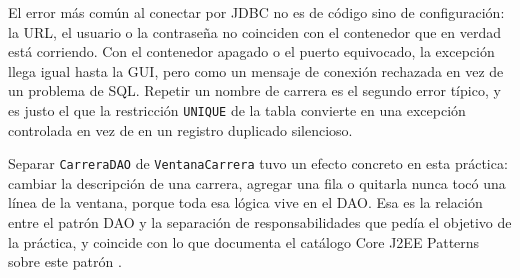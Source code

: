 \documentclass[10pt,a4paper]{article}
\begin{document}
El error más común al conectar por JDBC no es de código sino de configuración: la URL, el usuario o la contraseña no coinciden con el contenedor que en verdad está corriendo. Con el contenedor apagado o el puerto equivocado, la excepción llega igual hasta la GUI, pero como un mensaje de conexión rechazada en vez de un problema de SQL. Repetir un nombre de carrera es el segundo error típico, y es justo el que la restricción \texttt{UNIQUE} de la tabla convierte en una excepción controlada en vez de en un registro duplicado silencioso.

Separar \texttt{CarreraDAO} de \texttt{VentanaCarrera} tuvo un efecto concreto en esta práctica: cambiar la descripción de una carrera, agregar una fila o quitarla nunca tocó una línea de la ventana, porque toda esa lógica vive en el DAO. Esa es la relación entre el patrón DAO y la separación de responsabilidades que pedía el objetivo de la práctica, y coincide con lo que documenta el catálogo Core J2EE Patterns sobre este patrón \cite{alur2003corej2ee}.

\section{\color{colorIPN}{Referencias Bibliográficas}}
\nocite{*}
\color{colorESCOM}{
	\printbibliography[heading=none]
}
\end{document}
